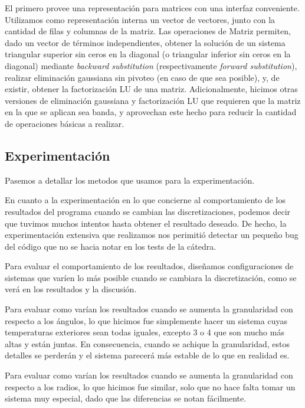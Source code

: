 El primero provee una representación para matrices con una interfaz conveniente. Utilizamos como representación interna un vector de vectores, junto con la cantidad de filas y columnas de la matriz. Las operaciones de Matriz permiten, dado un vector de términos independientes, obtener la solución de un sistema triangular superior sin ceros en la diagonal (o triangular inferior sin ceros en la diagonal) mediante \textit{backward substitution} (respectivamente \textit{forward substitution}), realizar eliminación gaussiana sin pivoteo (en caso de que sea posible), y, de existir, obtener la factorización LU de una matriz. Adicionalmente, hicimos otras versiones de eliminación gaussiana y factorización LU que requieren que la matriz en la que se aplican sea banda, y aprovechan este hecho para reducir la cantidad de operaciones básicas a realizar.\\

\subsection{Experimentación}

Pasemos a detallar los metodos que usamos para la experimentación.



En cuanto a la experimentación en lo que concierne al comportamiento de los resultados del programa cuando se cambian las discretizaciones, podemos decir que tuvimos muchos intentos hasta obtener el resultado deseado. De hecho, la experimentación extensiva que realizamos nos perimitió detectar un pequeño bug del código que no se hacia notar en los tests de la cátedra.

Para evaluar el comportamiento de los resultados, diseñamos configuraciones de sistemas que varíen lo más posible cuando se cambiara la discretización, como se verá en los resultados y la discusión.

Para evaluar como varían los resultados cuando se aumenta la granularidad con respecto a los ángulos, lo que hicimos fue simplemente hacer un sistema cuyas temperaturas exteriores sean todas iguales, excepto 3 o 4 que son mucho más altas y están juntas. En consecuencia, cuando se achique la granularidad, estos detalles se perderán y el sistema parecerá más estable de lo que en realidad es.

Para evaluar como varían los resultados cuando se aumenta la granularidad con respecto a los radios, lo que hicimos fue similar, solo que no hace falta tomar un sistema muy especial, dado que las diferencias se notan fácilmente.



